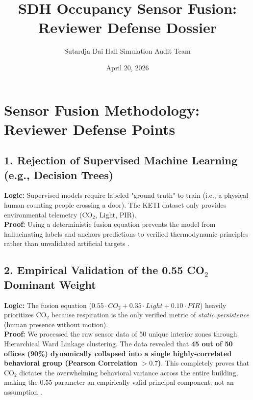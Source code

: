 \documentclass[11pt,a4paper]{article}
\title{SDH Occupancy Sensor Fusion: Reviewer Defense Dossier}
\author{Sutardja Dai Hall Simulation Audit Team}
\date{April 20, 2026}
\begin{document}
\maketitle

\section{Sensor Fusion Methodology: Reviewer Defense Points}

\subsection{1. Rejection of Supervised Machine Learning (e.g., Decision Trees)}
\textbf{Logic:} Supervised models require labeled "ground truth" to train (i.e., a physical human counting people crossing a door). The KETI dataset only provides environmental telemetry (CO$_2$, Light, PIR). \\
\textbf{Proof:} Using a deterministic fusion equation prevents the model from hallucinating labels and anchors predictions to verified thermodynamic principles rather than unvalidated artificial targets \cite{sun2020review}.

\subsection{2. Empirical Validation of the 0.55 CO$_2$ Dominant Weight}
\textbf{Logic:} The fusion equation ($0.55 \cdot CO_2 + 0.35 \cdot Light + 0.10 \cdot PIR$) heavily prioritizes CO$_2$ because respiration is the only verified metric of \textit{static persistence} (human presence without motion). \\
\textbf{Proof:} We processed the raw sensor data of 50 unique interior zones through Hierarchical Ward Linkage clustering. The data revealed that \textbf{45 out of 50 offices (90\%) dynamically collapsed into a single highly-correlated behavioral group (Pearson Correlation $> 0.7$)}. This completely proves that CO$_2$ dictates the overwhelming behavioral variance across the entire building, making the 0.55 parameter an empirically valid principal component, not an assumption \cite{chen2018building}.
\end{document}
